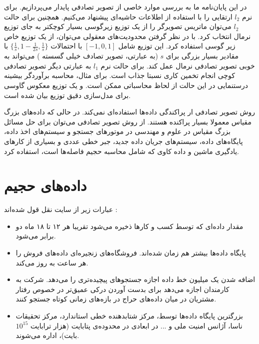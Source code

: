 در این پایان‌نامه ما به بررسی موارد خاصی از تصویر تصادفی پایدار می‌پردازیم. برای نرم 
$l_2$
ارتقایی را با استفاده از اطلاعات حاشیه‌ای پیشنهاد می‌کنیم. همچنین برای حالت $l_2$ می‌توان ماتریس تصویرگر را از یک توزیع زیرگوسی
بسیار کوچکتر به جای توزیع نرمال انتخاب کرد. با در نظر گرفتن محدودیت‌های معقولی می‌توان، از یک توزیع خاص زیر گوسی استفاده کرد. این توزیع شامل 
$[-1,0,1]$
با احتمالات 
$\{ \frac{1}{s}, 1-\frac{1}{2s}, \frac{1}{s} \}$
با مقادیر بسیار بزرگی برای 
‌‌‌$s$
(به عبارتی، تصویر تصادف خیلی گسسته 
) می‌تواند به خوبی تصویر تصادفی نرمال عمل کند. برای حالت نرم 
$l_1$
به عبارتی دیگر تصویر تصادفی کوچی 
انجام تخمین کاری نسبتا جذاب است. برای مثال، محاسبه برآوردگر بیشینه درستنمایی 
در این حالت از لحاظ محاسباتی ممکن است. و یک توزیع معکوس گاوسی 
برای مدل‌سازی دقیق توزیع 
بیان شده است.

روش تصویر تصادفی ار پراکندگی داده‌ها استفاده‌ای نمی‌کند. در حالی که داده‌های بزرگ مقیاس معمولا بسیار پراکنده هستند. از روش تصویر تصادفی می‌توان برای حل مسائل بزرگ مقیاس در علوم و مهندسی در موتورهای جستجو و سیستم‌های اخذ داده، پایگاه‌های داده، سیستم‌های جریان داده جدید، جبر خطی عددی و بسیاری از کارهای یادگیری ماشین و داده کاوی که شامل محاسبه حجیم فاصله‌ها است، استفاده کرد.




\section{داده‌های حجیم}
عبارات زیر از سایت 
نقل قول شده‌اند
:

\begin{itemize}
\item
مقدار داده‌ای که توسط کسب و کارها ذخیره می‌شود تقریبا هر ۱۲ تا ۱۸ ماه دو برابر می‌شود.
\item
پایگاه داده‌ها بیشتر هم ‌زمان شده‌اند. فروشگاه‌های زنجیره‌ای 
داده‌های فروش را هر ساعت به روز می‌کند.
\item
اضافه شدن یک میلیون خط داده اجازه جستجوهای پیچیده‌تری را می‌دهد. شرکت 
به کارمندان اجازه می‌دهد برای بدست آوردن درکی عمیق‌تر در خصوص رفتار مشتریان در میان داده‌های حراج در بازه‌های زمانی کوتاه جستجو کنند.
\item
بزرگترین پایگاه داده‌ها توسط، مرکز شتابدهنده خطی استاندارد، مرکز تحقیقات ناسا، آژانس امنیت ملی و ... در ابعادی در محدوده‌ی پتابایت (هزار ترابایت 
$10^15$
بایت)، اداره می‌شوند.
\end{itemize}

